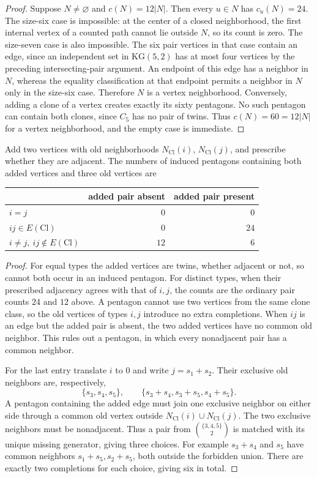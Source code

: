 \begin{proof}
Suppose $N\ne\varnothing$ and $c(N)=12|N|$. Then every $u\in N$ has
$c_u(N)=24$. The size-six case is impossible: at the center of a closed
neighborhood, the first internal vertex of a counted path cannot lie
outside $N$, so its count is zero. The size-seven case is also
impossible. The six pair vertices in that case contain an edge, since
an independent set in $\mathrm{KG}(5,2)$ has at most four vertices by
the preceding intersecting-pair argument. An endpoint of this edge has
a neighbor in $N$, whereas the equality classification at that endpoint
permits a neighbor in $N$ only in the size-six case. Therefore $N$ is
a vertex neighborhood. Conversely, adding a clone of a vertex creates
exactly its sixty pentagons. No such pentagon can contain both clones,
since $C_5$ has no pair of twins. Thus $c(N)=60=12|N|$ for a vertex
neighborhood, and the empty case is immediate.
\end{proof}

\begin{lemma}\label{lem:two-vertex}
Add two vertices with old neighborhoods $N_{\mathrm{Cl}}(i)$,
$N_{\mathrm{Cl}}(j)$, and prescribe whether they are adjacent. The
numbers of induced pentagons containing both added vertices and three
old vertices are
\begin{center}
\begin{tabular}{lrr}
\toprule
&added pair absent&added pair present\\
\midrule
$i=j$&$0$&$0$\\
$ij\in E(\mathrm{Cl})$&$0$&$24$\\
$i\ne j,\ ij\notin E(\mathrm{Cl})$&$12$&$6$\\
\bottomrule
\end{tabular}
\end{center}
\end{lemma}
\begin{proof}
For equal types the added vertices are twins, whether adjacent or not,
so cannot both occur in an induced pentagon. For distinct types, when
their prescribed adjacency agrees with that of $i,j$, the counts are
the ordinary pair counts $24$ and $12$ above. A pentagon cannot use
two vertices from the same clone class, so the old vertices of types
$i,j$ introduce no extra completions. When $ij$ is an edge but the
added pair is absent, the two added vertices have no common old
neighbor. This rules out a pentagon, in which every nonadjacent pair
has a common neighbor.

For the last entry translate $i$ to $0$ and write $j=s_1+s_2$. Their
exclusive old neighbors are, respectively,
\[
 \{s_3,s_4,s_5\},\qquad
 \{s_3+s_4,s_3+s_5,s_4+s_5\}.
\]
A pentagon containing the added edge must join one exclusive neighbor
on either side through a common old vertex outside
$N_{\mathrm{Cl}}(i)\cup N_{\mathrm{Cl}}(j)$. The two exclusive
neighbors must be nonadjacent. Thus a pair from
$\binom{\{3,4,5\}}{2}$ is matched with its unique missing generator,
giving three choices. For example $s_3+s_4$ and $s_5$ have common
neighbors $s_1+s_5,s_2+s_5$, both outside the forbidden union. There
are exactly two completions for each choice, giving six in total.
\end{proof}

